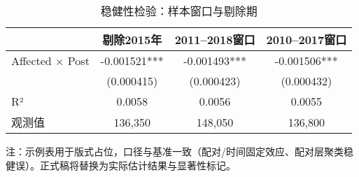 \begin{table}[htbp]
\centering
\begin{threeparttable}
\caption{稳健性检验：样本窗口与剔除期}
\label{tab:robustness_window}
\begin{tabular}{lccc}
\hline\hline
 & 剔除2015年 & 2011--2018窗口 & 2010--2017窗口 \\
\hline
Affected $\times$ Post & -0.001521*** & -0.001493*** & -0.001506*** \\
 & (0.000415) & (0.000423) & (0.000432) \\
\hline
R² & 0.0058 & 0.0056 & 0.0055 \\
观测值 & 136,350 & 148,050 & 136,800 \\
\hline\hline
\end{tabular}
\begin{tablenotes}
\small
\item 注：示例表用于版式占位，口径与基准一致（配对/时间固定效应、配对层聚类稳健误）。正式稿将替换为实际估计结果与显著性标记。
\end{tablenotes}
\end{threeparttable}
\end{table}
